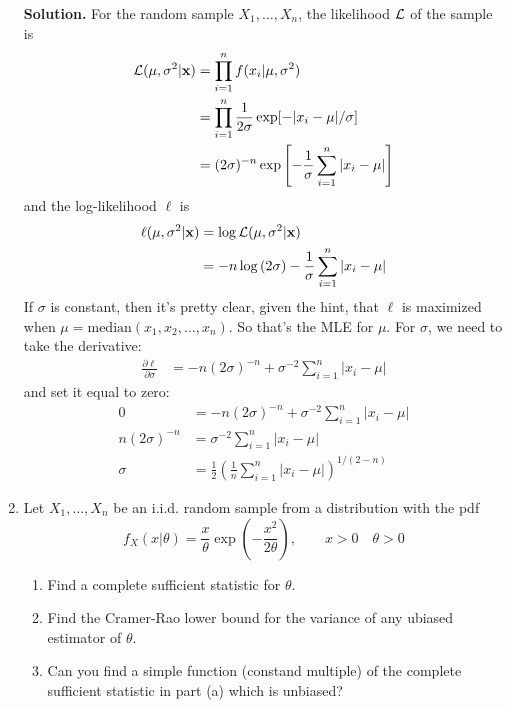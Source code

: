 \documentclass[titlepage]{article}
\begin{document}
\begin{enumerate}
\textbf{Solution.} For the random sample $X_1, \ldots, X_n$, the likelihood $\mathcal{L}$ of the sample is
  \[ \begin{aligned}
  \mathcal{L}(\mu, \sigma^2 | \mathbf{x}) &= \prod_{i=1}^n f(x_i|\mu, \sigma^2) \\
  &= \prod_{i=1}^n\frac{1}{2\sigma} \exp[-|x_i - \mu|/\sigma] \\
  &= (2\sigma)^{-n} \exp\left[-\frac{1}{\sigma}\sum_{i=1}^n|x_i - \mu|\right]
  \end{aligned} \]
and the log-likelihood $\ell$ is
  \[ \begin{aligned}
  \ell(\mu, \sigma^2 | \mathbf{x}) &= \log \mathcal{L}(\mu, \sigma^2 | \mathbf{x}) \\
                                &= -n \log\left(2\sigma\right) - \frac{1}{\sigma}\sum_{i=1}^n |x_i - \mu|
  \end{aligned} \]
If $\sigma$ is constant, then it's pretty clear, given the hint, that $\ell$ is maximized when $\mu = \text{median}(x_1, x_2, \ldots, x_n)$. So that's the MLE for $\mu$. For $\sigma$, we need to take the derivative:
  \[\begin{aligned}
  \frac{\partial \ell}{\partial \sigma} &= -n(2\sigma)^{-n} + \sigma^{-2} \sum_{i=1}^n |x_i - \mu|
  \end{aligned}\]
and set it equal to zero:
  \[\begin{aligned}
  0 &= -n(2\sigma)^{-n} + \sigma^{-2} \sum_{i=1}^n |x_i - \mu| \\
  n(2\sigma)^{-n} &= \sigma^{-2} \sum_{i=1}^n |x_i - \mu| \\
  \sigma &= \frac{1}{2}\left(\frac{1}{n}\sum_{i=1}^n|x_i - \mu|\right)^{1/(2-n)}
  \end{aligned}\]

\item Let $X_1, \ldots, X_n$ be an i.i.d. random sample from a distribution with the pdf
  \[f_X(x|\theta) = \frac{x}{\theta}\exp\left(-\frac{x^2}{2\theta}\right),\qquad x > 0 \quad \theta > 0\]

  \begin{enumerate}
  \item Find a complete sufficient statistic for $\theta$.

  \item Find the Cramer-Rao lower bound for the variance of any ubiased estimator of $\theta$.

  \item Can you find a simple function (constand multiple) of the complete sufficient statistic in part (a) which is unbiased?


\end{enumerate}
\end{enumerate}
\end{document}
